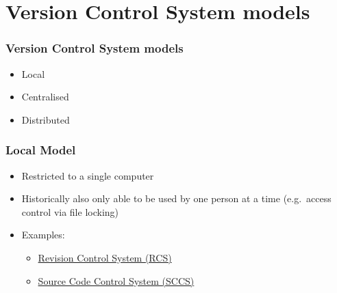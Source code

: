 \appendix

\section{Version Control System models}

\begin{frame}
    \frametitle{Version Control System models}
    \begin{itemize}
        \item Local
        \item Centralised
        \item Distributed
    \end{itemize}
\end{frame}

\begin{frame}
\frametitle{Local Model}
\begin{itemize}
    \item Restricted to a single computer
    \item Historically also only able to be used by one person at a time
        (e.g.\ access control via file locking)
    \item Examples:
        \begin{itemize}
            \item \href{https://en.wikipedia.org/wiki/Revision_Control_System}
                       {Revision Control System (RCS)}
            \item \href{https://en.wikipedia.org/wiki/Source_Code_Control_System}
                       {Source Code Control System (SCCS)}
        \end{itemize}
\end{itemize}
\end{frame}


